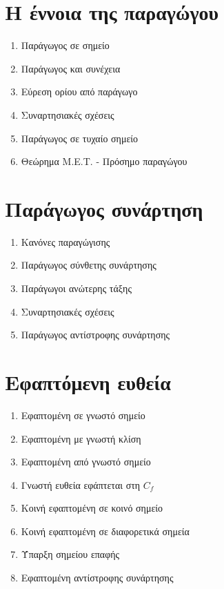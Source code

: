 \documentclass[twoside,nofonts,math,spyros,ektypwsh]{frontisthrio}
\begin{document}
\section{Η έννοια της παραγώγου}
\begin{multicols}{2}
\begin{enumerate}
\item Παράγωγος σε σημείο
\item Παράγωγος και συνέχεια
\item Εύρεση ορίου από παράγωγο
\item Συναρτησιακές σχέσεις
\item Παράγωγος σε τυχαίο σημείο
\item Θεώρημα Μ.Ε.Τ. - Πρόσημο παραγώγου
\end{enumerate}
\end{multicols}
\section{Παράγωγος συνάρτηση}
\begin{multicols}{2}
\begin{enumerate}
\item Κανόνες παραγώγισης
\item Παράγωγος σύνθετης συνάρτησης
\item Παράγωγοι ανώτερης τάξης
\item Συναρτησιακές σχέσεις
\item Παράγωγος αντίστροφης συνάρτησης
\end{enumerate}
\end{multicols}
\section{Εφαπτόμενη ευθεία}
\begin{multicols}{2}
\begin{enumerate}
\item Εφαπτομένη σε γνωστό σημείο
\item Εφαπτομένη με γνωστή κλίση
\item Εφαπτομένη από γνωστό σημείο
\item Γνωστή ευθεία εφάπτεται στη $ C_f $
\item Κοινή εφαπτομένη σε κοινό σημείο
\item Κοινή εφαπτομένη σε διαφορετικά σημεία
\item Ύπαρξη σημείου επαφής
\item Εφαπτομένη αντίστροφης συνάρτησης
\end{enumerate}
\end{multicols}
\end{document}
